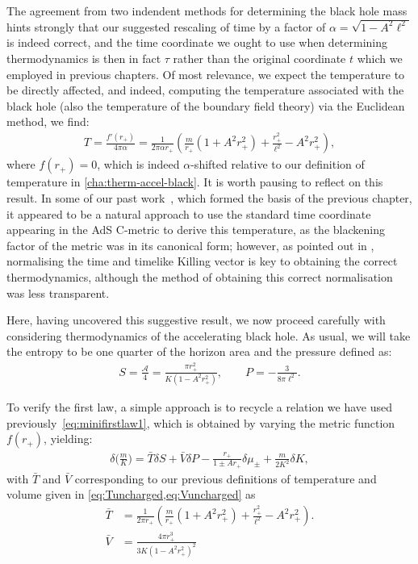 \documentclass[
twoside,
openright,
frontopenright,
]{dmathesis}
\newcommand{\nn}{\nonumber}
\newcommand{\tcr}{\textcolor{red}}
\begin{document}
The agreement from two indendent methods for determining the black hole mass
hints strongly that our suggested rescaling of time by a factor of $\alpha =
\sqrt{1-A^2\ell^2}$ is indeed correct, and the time coordinate we ought to use
when determining thermodynamics is then in fact $\tau$ rather than the original
coordinate $t$ which we employed in previous chapters. Of most relevance, we
expect the temperature to be directly affected, and indeed, computing the
temperature associated with the black hole (also the temperature of the boundary
field theory) via the Euclidean method, we find:
\begin{align}
  T=\frac{f'(r_+)}{4\pi\alpha} = \frac{1}{2\pi \alpha r_+}\left(\frac{m}{r_+}\left(1+A^2r_+^2
\right) + \frac{r_+^2}{\ell^2} - A^2 r_+^2\right),
  \label{temp}
\end{align}
where $f(r_+)=0$, which is indeed $\alpha$-shifted relative to our definition of
temperature in \cref{cha:therm-accel-black}. It is worth pausing to reflect on
this result. In some of our past
work~\cite{Appels:2016uha,Appels:2017xoe,Gregory:2017ogk}, which formed the
basis of the previous chapter, it appeared to be a natural approach to use the
standard time coordinate appearing in the AdS C-metric to derive this
temperature, as the blackening factor of the metric was in its canonical form;
however, as pointed out in \cite{Gibbons:2004ai}, normalising the time and
timelike Killing vector is key to obtaining the correct thermodynamics, although
the method of obtaining this correct normalisation was less transparent.

Here, having uncovered this suggestive result, we now proceed carefully with
considering thermodynamics of the accelerating black hole. As usual, we will
take the entropy to be one quarter of the horizon area and the pressure defined as:
\begin{align}
S=\frac{\mathcal{A}}{4}=\frac{\pi r_+^2}{K(1-A^2r_+^2)}, \qquad P=-\frac{3}{8\pi\ell^2}.
\label{entropy}
\end{align}

To verify the first law, a simple approach is to recycle a relation we have used
previously~\eqref{eq:minifirstlaw1}, which is obtained by varying the metric
function $f(r_+)$, yielding:
\begin{align}
  \label{eq:deltamK}
  \delta \Big(\frac{m}{K}\Big) = \bar{T} \delta S + \bar{V} \delta P -
  \frac{r_+}{1\pm Ar_+}\delta \mu_\pm + \frac{m}{2K^2}\delta K,
\end{align}
with $\bar{T}$ and $\bar{V}$ corresponding to our previous definitions of
temperature and volume given in \cref{eq:Tuncharged,eq:Vuncharged} as
\begin{align}
  \bar{T} &= \frac{1}{2\pi r_+}\left(\frac{m}{r_+}\left(1+A^2r_+^2
\right) + \frac{r_+^2}{\ell^2} - A^2 r_+^2\right).\nn\\
\bar{V} &= \frac{4\pi r_+^3}{3K(1-A^2r_+^2)^2}
\end{align}
\end{document}

